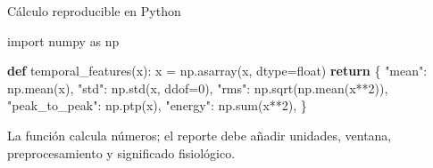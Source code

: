 \documentclass[
  ignorenonframetext,
  aspectratio=169,
  spanish,
  professionalfonts]{beamer}
\newenvironment{Shaded}{\begin{snugshade}}{\end{snugshade}}
\newcommand{\BuiltInTok}[1]{\textcolor[rgb]{0.00,0.23,0.31}{#1}}
\newcommand{\ControlFlowTok}[1]{\textcolor[rgb]{0.00,0.23,0.31}{\textbf{#1}}}
\newcommand{\DecValTok}[1]{\textcolor[rgb]{0.68,0.00,0.00}{#1}}
\newcommand{\ImportTok}[1]{\textcolor[rgb]{0.00,0.46,0.62}{#1}}
\newcommand{\KeywordTok}[1]{\textcolor[rgb]{0.00,0.23,0.31}{\textbf{#1}}}
\newcommand{\NormalTok}[1]{\textcolor[rgb]{0.00,0.23,0.31}{#1}}
\newcommand{\OperatorTok}[1]{\textcolor[rgb]{0.37,0.37,0.37}{#1}}
\newcommand{\StringTok}[1]{\textcolor[rgb]{0.13,0.47,0.30}{#1}}
\begin{document}
\begin{frame}{Cálculo reproducible en Python}
\protect{}\label{cuxe1lculo-reproducible-en-python}
\begin{Shaded}
\begin{Highlighting}[]
\ImportTok{import}\NormalTok{ numpy }\ImportTok{as}\NormalTok{ np}

\KeywordTok{def}\NormalTok{ temporal\_features(x):}
\NormalTok{    x }\OperatorTok{=}\NormalTok{ np.asarray(x, dtype}\OperatorTok{=}\BuiltInTok{float}\NormalTok{)}
    \ControlFlowTok{return}\NormalTok{ \{}
        \StringTok{"mean"}\NormalTok{: np.mean(x),}
        \StringTok{"std"}\NormalTok{: np.std(x, ddof}\OperatorTok{=}\DecValTok{0}\NormalTok{),}
        \StringTok{"rms"}\NormalTok{: np.sqrt(np.mean(x}\OperatorTok{**}\DecValTok{2}\NormalTok{)),}
        \StringTok{"peak\_to\_peak"}\NormalTok{: np.ptp(x),}
        \StringTok{"energy"}\NormalTok{: np.}\BuiltInTok{sum}\NormalTok{(x}\OperatorTok{**}\DecValTok{2}\NormalTok{),}
\NormalTok{    \}}
\end{Highlighting}
\end{Shaded}

\begin{tcolorbox}[enhanced jigsaw, arc=.35mm, bottomrule=.15mm, bottomtitle=1mm, breakable, colback=white, colbacktitle=quarto-callout-tip-color!10!white, colframe=quarto-callout-tip-color-frame, coltitle=black, left=2mm, leftrule=.75mm, opacityback=0, opacitybacktitle=0.6, rightrule=.15mm, title={Buena práctica}, titlerule=0mm, toprule=.15mm, toptitle=1mm]

La función calcula números; el reporte debe añadir unidades, ventana,
preprocesamiento y significado fisiológico.

\end{tcolorbox}
\end{frame}
\end{document}
